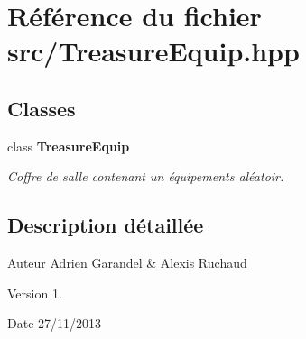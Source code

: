 \section{Référence du fichier src/\-Treasure\-Equip.hpp}
\label{_treasure_equip_8hpp}
\subsection*{Classes}
\begin{DoxyCompactItemize}
\item 
class {\bf Treasure\-Equip}
\begin{DoxyCompactList}\small\item\em Coffre de salle contenant un équipements aléatoir. \end{DoxyCompactList}\end{DoxyCompactItemize}


\subsection{Description détaillée}
\begin{DoxyAuthor}{Auteur}
Adrien Garandel \& Alexis Ruchaud 
\end{DoxyAuthor}
\begin{DoxyVersion}{Version}
1. 
\end{DoxyVersion}
\begin{DoxyDate}{Date}
27/11/2013 
\end{DoxyDate}

